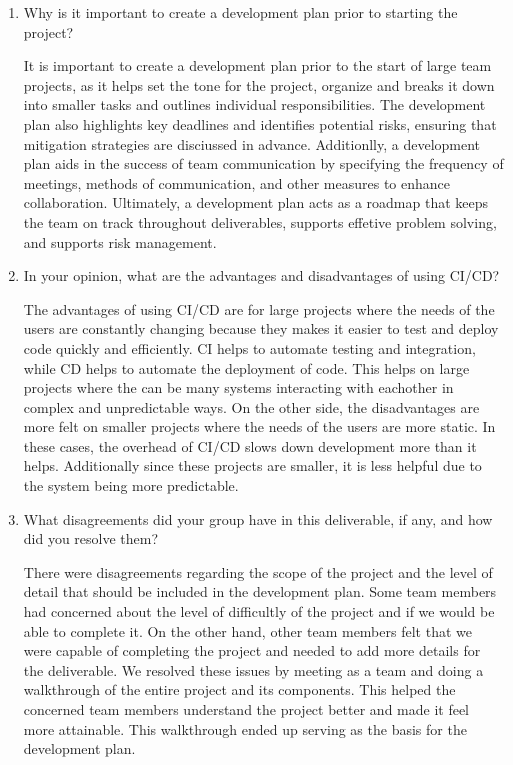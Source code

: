 \documentclass{article}
\begin{document}
\begin{enumerate}
    \item Why is it important to create a development plan prior to starting the
    project?

    It is important to create a development plan prior to the start of large team projects, as it helps set the tone for the project, organize and breaks it down into smaller tasks and outlines individual responsibilities. 
    The development plan also highlights key deadlines and identifies potential risks, ensuring that mitigation strategies are disciussed in advance.
    Additionlly, a development plan aids in the success of team communication by specifying the frequency of meetings, methods of communication, and other measures to enhance collaboration.
    Ultimately, a development plan acts as a roadmap that keeps the team on track throughout deliverables, supports effetive problem solving, and supports risk management.

    \item In your opinion, what are the advantages and disadvantages of using
    CI/CD?

    The advantages of using CI/CD are for large projects where the needs of the users are constantly changing because they makes it easier to test and deploy code quickly and efficiently.
    CI helps to automate testing and integration, while CD helps to automate the deployment of code.
    This helps on large projects where the can be many systems interacting with eachother in complex and unpredictable ways.
    On the other side, the disadvantages are more felt on smaller projects where the needs of the users are more static.
    In these cases, the overhead of CI/CD slows down development more than it helps.
    Additionally since these projects are smaller, it is less helpful due to the system being more predictable.


    \item What disagreements did your group have in this deliverable, if any,
    and how did you resolve them?

    There were disagreements regarding the scope of the project and the level of detail that should be included in the development plan. 
    Some team members had concerned about the level of difficultly of the project and if we would be able to complete it. On the other hand,
    other team members felt that we were capable of completing the project and needed to add more details for the deliverable.
    We resolved these issues by meeting as a team and doing a walkthrough of the entire project and its components.
    This helped the concerned team members understand the project better and made it feel more attainable. 
    This walkthrough ended up serving as the basis for the development plan.
    
\end{enumerate}
\end{document}
